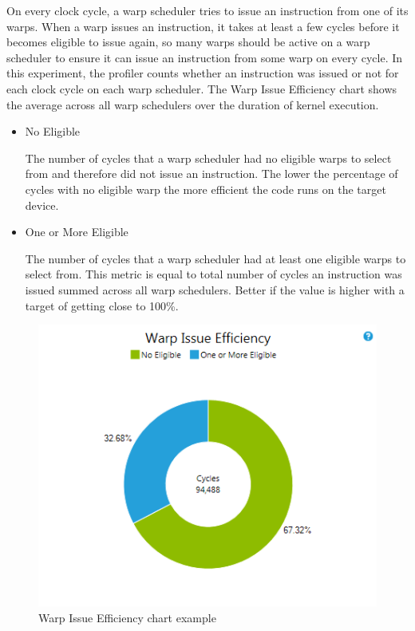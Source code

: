 \documentclass[oneside,openright,12pt,final,en]{mgr}
\begin{document}
\begin{itemize}
	On every clock cycle, a warp scheduler tries to issue an instruction from one of its warps. When a warp issues an instruction, it takes at least a few cycles before it becomes eligible to issue again, so many warps should be active on a warp scheduler to ensure it can issue an instruction from some warp on every cycle. In this experiment, the profiler counts whether an instruction was issued or not for each clock cycle on each warp scheduler. The Warp Issue Efficiency chart shows the average across all warp schedulers over the duration of kernel execution. 
		
	\begin{itemize}
		
		\item No Eligible  
		
		The number of cycles that a warp scheduler had no eligible warps to select from and therefore did not issue an instruction. The lower the percentage of cycles with no eligible warp the more efficient the code runs on the target device.
		
		\item One or More Eligible
		
		The number of cycles that a warp scheduler had at least one eligible warps to select from. This metric is equal to total number of cycles an instruction was issued summed across all warp schedulers. Better if the value is higher with a target of getting close to 100\%.
		
	\end{itemize}
	
	\begin{figure}[H]
		\centering
		\includegraphics{IssueEfficiencyChartWarpIssueEfficiency}
		\caption{Warp Issue Efficiency chart example}
	\end{figure}





\end{itemize}
\end{document}

